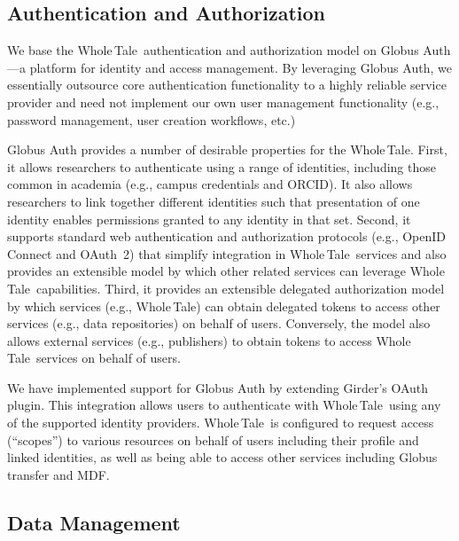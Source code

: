 \documentclass[review]{elsarticle}
\newcommand{\wt}{Whole\,Tale}
\begin{document}
\subsection{Authentication and Authorization}
We base the \wt\ authentication and authorization model on Globus Auth \cite{tuecke16auth}---a 
platform for identity and access management. 
By leveraging Globus Auth, we essentially outsource core authentication functionality
to a highly reliable service provider and need not implement
our own user management functionality (e.g., password management, user creation workflows, etc.)

Globus Auth provides a number of desirable properties for the \wt. 
First, it allows researchers to authenticate using a range of identities, 
including those common in academia (e.g., campus credentials and ORCID).
It also allows researchers to link together different identities such that
presentation of one identity enables permissions granted to any identity
in that set. 
Second, it supports standard web authentication and authorization protocols
(e.g., OpenID Connect and OAuth~2) that simplify integration in 
\wt\ services and also provides an extensible model by which 
other related services can leverage \wt\ capabilities. Third, it provides 
an extensible delegated authorization model by which services (e.g., \wt)
can obtain delegated tokens to access other services (e.g., data repositories)
on behalf of users. Conversely, the model also allows external services 
(e.g., publishers) to obtain tokens to access \wt\ services on behalf of users. 

We have implemented support for Globus Auth by extending Girder's OAuth plugin.
This integration allows users to authenticate with \wt\ 
using any of the supported identity 
providers. \wt\ is configured to request access (``scopes'') to various resources
on behalf of users including their profile and linked identities, 
as well as being able to access other services including Globus transfer 
and MDF. 


\subsection{Data Management}
\label{sec:dm_plugin}
\end{document}
